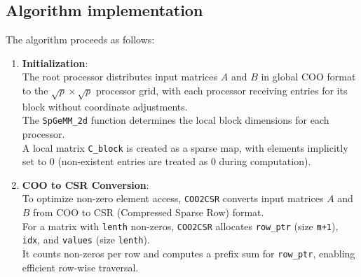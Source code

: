 \documentclass[11pt]{article}
\begin{document}
\subsection{Algorithm implementation}
The algorithm proceeds as follows:
\begin{enumerate}
	\item \textbf{Initialization}:\\
        {\color{black}The root processor distributes input matrices $A$ and $B$ in global COO format to the $\sqrt{p} \times \sqrt{p}$ processor grid, with each processor receiving entries for its block without coordinate adjustments. }\\
        The \texttt{SpGeMM\_2d} function determines the local block dimensions for each processor.\\
        A local matrix \texttt{C\_block} is created as a sparse map, with elements implicitly set to 0 (non-existent entries are treated as 0 during computation). \\
        
    \item \textbf{COO to CSR Conversion}:\\
        To optimize non-zero element access, \texttt{COO2CSR} converts input matrices $A$ and $B$ from COO to CSR (Compressed Sparse Row) format.\\
        For a matrix with \texttt{lenth} non-zeros, \texttt{COO2CSR} allocates \texttt{row\_ptr} (size \texttt{m+1}), \texttt{idx}, and \texttt{values} (size \texttt{lenth}).\\
        It counts non-zeros per row and computes a prefix sum for \texttt{row\_ptr}, enabling efficient row-wise traversal.


\end{enumerate}
\end{document}
